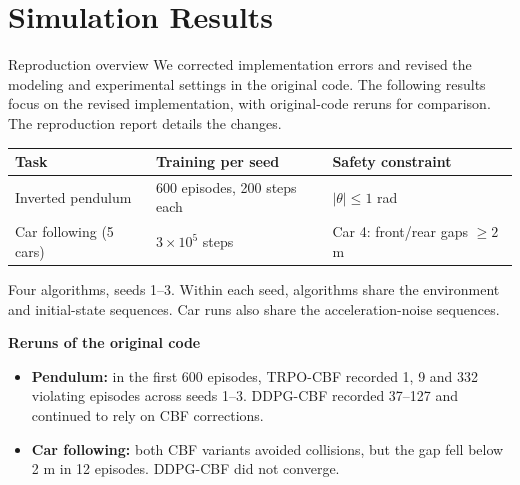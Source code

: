 \documentclass[aspectratio=169,10pt]{beamer}
\newcommand{\pos}[1]{\textcolor{positive}{#1}}
\begin{document}
\section{Simulation Results}
\begin{frame}{Reproduction overview}
\small
We corrected implementation errors and revised the modeling and experimental settings in the original code. The following results focus on the revised implementation, with original-code reruns for comparison. The reproduction report details the changes.
\vspace{.35em}
\begin{center}
\renewcommand{\arraystretch}{1.23}
\begin{tabular}{@{}lll@{}}
\toprule
Task & Training per seed & Safety constraint\\\midrule
Inverted pendulum & 600 episodes, 200 steps each & $|\theta|\le1$ rad\\
Car following (5 cars) & $3\times10^5$ steps & Car 4: front/rear gaps $\ge2$ m\\
\bottomrule
\end{tabular}
\end{center}
Four algorithms, seeds 1--3. Within each seed, algorithms share the environment and initial-state sequences. Car runs also share the acceleration-noise sequences.
\par\vspace{.45em}
\noindent\pos{\textbf{Reruns of the original code}}\par
\begin{itemize}\setlength\itemsep{.4em}
\item \textbf{Pendulum:} in the first 600 episodes, TRPO-CBF recorded 1, 9 and 332 violating episodes across seeds 1--3. DDPG-CBF recorded 37--127 and continued to rely on CBF corrections.
\item \textbf{Car following:} both CBF variants avoided collisions, but the gap fell below 2 m in 12 episodes. DDPG-CBF did not converge.
\end{itemize}
\end{frame}
\end{document}
